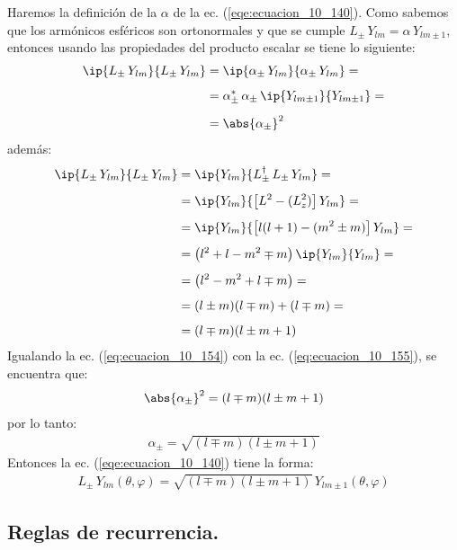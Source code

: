 Haremos la definición de la $\alpha$ de la ec. (\ref{eqe:ecuacion_10_140}). Como sabemos que los armónicos esféricos son ortonormales y que se cumple $L_{\pm} \, Y_{l m} = \alpha \, Y_{l m \pm 1}$, entonces usando las propiedades del producto escalar se tiene lo siguiente:
\begin{align}
\begin{aligned}[b]
\ip{L_{\pm} \, Y_{l m}}{L_{\pm} \, Y_{l m}} &= \ip{\alpha_{\pm} \, Y_{l m}}{\alpha_{\pm} \, Y_{l m}} =  \\[0.5em]
&= \alpha_{\pm}^{*} \, \alpha_{\pm} \, \ip{Y_{l m \pm 1}}{Y_{l m \pm 1}} = \\[0.5em]
&= \abs{\alpha_{\pm}}^{2}
\end{aligned}
\label{eq:ecuacion_10_154}
\end{align}
además:
\begin{align}
\begin{aligned}[b]
\ip{L_{\pm} \, Y_{l m}}{L_{\pm} \, Y_{l m}} &= \ip{Y_{l m}}{L_{\pm}^{\dagger} \, L_{\pm} \, Y_{l m}} = \\[0.5em]
&= \ip{Y_{l m}}{\big[ L^{2} - (L_{z}^{2}) \big] \, Y_{ l m}} = \\[0.5em]
&= \ip{Y_{l m}}{ \big[ l (l + 1) - (m^{2} \pm m) \big] \, Y_{l m}} = \\[0.5em]
&= \big( l^{2} + l - m ^{2} \mp m \big) \, \ip{Y_{l m}}{Y_{l m}} = \\[0.5em]
&= \big( l^{2} - m ^{2} + l \mp m \big) = \\[0.5em]
&= ( l \pm m)(l \mp m) + (l \mp m) = \\[0.5em]
&= (l \mp m)(l \pm m + 1)
\end{aligned}
\label{eq:ecuacion_10_155}
\end{align}
Igualando la ec. (\ref{eq:ecuacion_10_154}) con la ec. (\ref{eq:ecuacion_10_155}), se encuentra que:
\begin{align}
\abs{\alpha_{\pm}}^{2} = (l \mp m)(l \pm m + 1)
\label{eq:ecuacion_10_156}
\end{align}
por lo tanto:
\begin{align}
\alpha_{\pm} = \sqrt{(l \mp m)(l \pm m + 1)}
\label{eq:ecuacion_10_157}
\end{align}
Entonces la ec. (\ref{eqe:ecuacion_10_140}) tiene la forma:
\begin{align}
L_{\pm} \, Y_{l m} (\theta, \varphi) = \sqrt{(l \mp m)(l \pm m + 1)} \, Y_{l m \pm 1} (\theta, \varphi)
\label{eq:ecuacion_10_158}
\end{align}

\subsection{Reglas de recurrencia.}

